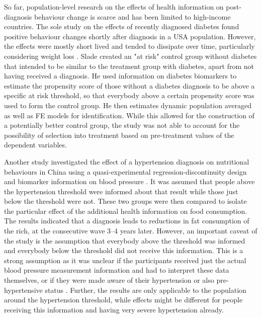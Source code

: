 So far, population-level research on the effects of health information on post-diagnosis behaviour change is scarce and has been limited to high-income countries. The sole study on the effects of recently diagnosed diabetes found positive behaviour changes shortly after diagnosis in a USA population. However, the effects were mostly short lived and tended to dissipate over time, particularly considering weight loss \autocite{Slade2012}. Slade created an "at risk" control group without diabetes that intended to be similar to the treatment group with diabetes, apart from not having received a diagnosis. He used information on diabetes biomarkers to estimate the propensity score of those without a diabetes diagnosis to be above a specific at risk threshold, so that everybody above a certain propensity score was used to form the control group. He then estimates dynamic population averaged as well as \ac{FE} models for identification. While this allowed for the construction of a potentially better control group, the study was not able to account for the possibility of selection into treatment based on pre-treatment values of the dependent variables.

Another study investigated the effect of a hypertension diagnosis on nutritional behaviours in China using a quasi-experimental regression-discontinuity design and biomarker information on blood pressure \autocite{Zhao2013a}. It was assumed that people above the hypertension threshold were informed about that result while those just below the threshold were not. These two groups were then compared to isolate the particular effect of the additional health information on food consumption. The results indicated that a diagnosis leads to reductions in fat consumption of the rich, at the consecutive wave 3--4 years later. However, an important caveat of the study is the assumption that everybody above the threshold was informed and everybody below the threshold did not receive this information. This is a strong assumption as it was unclear if the participants received just the actual blood pressure measurement information and had to interpret these data themselves, or if they were made aware of their hypertension or also pre-hypertensive status \autocite{Zhao2013a}. Further, the results are only applicable to the population around the hypertension threshold, while effects might be different for people receiving this information and having very severe hypertension already.


